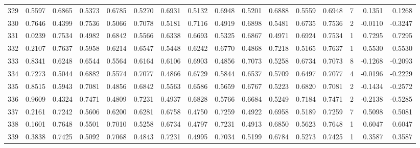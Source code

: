 \begin{tabular}{lrrrrrrrrrrrrrrr}
329 &      0.5597 &  0.6865 &  0.5373 &  0.6785 &  0.5270 &  0.6931 &  0.5132 &  0.6948 &  0.5201 &  0.6888 &   0.5559 &     0.6948 &      7 &                    0.1351 &                     0.1268 \\
330 &      0.7646 &  0.4399 &  0.7536 &  0.5066 &  0.7078 &  0.5181 &  0.7116 &  0.4919 &  0.6898 &  0.5481 &   0.6735 &     0.7536 &      2 &                   -0.0110 &                    -0.3247 \\
331 &      0.0239 &  0.7534 &  0.4982 &  0.6842 &  0.5566 &  0.6338 &  0.6693 &  0.5325 &  0.6867 &  0.4971 &   0.6924 &     0.7534 &      1 &                    0.7295 &                     0.7295 \\
332 &      0.2107 &  0.7637 &  0.5958 &  0.6214 &  0.6547 &  0.5448 &  0.6242 &  0.6770 &  0.4868 &  0.7218 &   0.5165 &     0.7637 &      1 &                    0.5530 &                     0.5530 \\
333 &      0.8341 &  0.6248 &  0.6544 &  0.5564 &  0.6164 &  0.6106 &  0.6903 &  0.4856 &  0.7073 &  0.5258 &   0.6734 &     0.7073 &      8 &                   -0.1268 &                    -0.2093 \\
334 &      0.7273 &  0.5044 &  0.6882 &  0.5574 &  0.7077 &  0.4866 &  0.6729 &  0.5844 &  0.6537 &  0.5709 &   0.6497 &     0.7077 &      4 &                   -0.0196 &                    -0.2229 \\
335 &      0.8515 &  0.5943 &  0.7081 &  0.4856 &  0.6842 &  0.5563 &  0.6586 &  0.5659 &  0.6767 &  0.5223 &   0.6820 &     0.7081 &      2 &                   -0.1434 &                    -0.2572 \\
336 &      0.9609 &  0.4324 &  0.7471 &  0.4809 &  0.7231 &  0.4937 &  0.6828 &  0.5766 &  0.6684 &  0.5249 &   0.7184 &     0.7471 &      2 &                   -0.2138 &                    -0.5285 \\
337 &      0.2161 &  0.7242 &  0.5606 &  0.6200 &  0.6281 &  0.6758 &  0.4750 &  0.7259 &  0.4922 &  0.6958 &   0.5189 &     0.7259 &      7 &                    0.5098 &                     0.5081 \\
338 &      0.1601 &  0.7648 &  0.5501 &  0.7010 &  0.5258 &  0.6734 &  0.4797 &  0.7231 &  0.4913 &  0.6850 &   0.5623 &     0.7648 &      1 &                    0.6047 &                     0.6047 \\
339 &      0.3838 &  0.7425 &  0.5092 &  0.7068 &  0.4843 &  0.7231 &  0.4995 &  0.7034 &  0.5199 &  0.6784 &   0.5273 &     0.7425 &      1 &                    0.3587 &                     0.3587 \\

\end{tabular}
